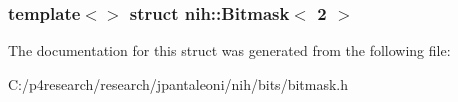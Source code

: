 \subsubsection*{template$<$$>$ struct nih\-::\-Bitmask$<$ 2 $>$}



\-The documentation for this struct was generated from the following file\-:\begin{DoxyCompactItemize}
\item 
\-C\-:/p4research/research/jpantaleoni/nih/bits/bitmask.\-h\end{DoxyCompactItemize}

